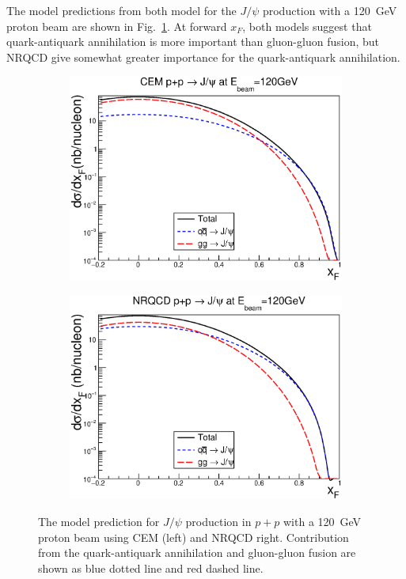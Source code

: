 \documentclass[10pt, a4paper,final]{article}
\begin{document}
The model predictions from both model for the $J/\psi$ production with a \SI{120}{\GeV}
proton beam are shown in Fig.~\ref{fig:jpsi_theory}. At forward $x_F$, both models suggest
that quark-antiquark annihilation is more important than gluon-gluon fusion, but NRQCD
give somewhat greater importance for the quark-antiquark annihilation.
\begin{figure}[htbp!]
	\centering
	\begin{subfigure}{0.45\linewidth}
		\includegraphics[width=0.9\linewidth]{pp_norm_cs_NLO_pp}
	\end{subfigure}
	\begin{subfigure}{0.45\linewidth}
		\includegraphics[width=0.9\linewidth]{jpsi_cs_pp}
	\end{subfigure}
	\caption{The model prediction for $J/\psi$ production in $p+p$ with a \SI{120}{\GeV}
		proton beam using CEM (left) and NRQCD {right}. Contribution from the
		quark-antiquark annihilation and gluon-gluon fusion are shown as blue dotted line
		and red dashed line.}
	\label{fig:jpsi_theory}
\end{figure}
\end{document}
